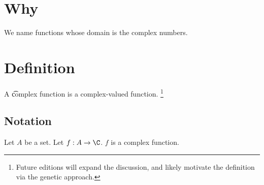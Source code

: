 
\section*{Why}

We name functions whose domain is the complex numbers.

\section*{Definition}

A \t{complex function} is a complex-valued function.
  \ifhmode\unskip\fi\footnote{
Future editions will expand the discussion, and likely motivate the definition via the genetic approach.
  }

\subsection*{Notation}

Let $A$ be a set.
Let $f: A \to \C $.
$f$ is a complex function.

\blankpage